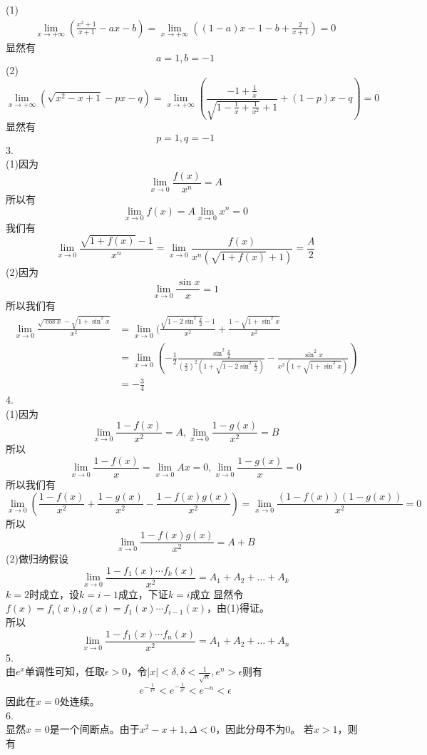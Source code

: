 \documentclass[utf8]{ctexart}
\begin{document}
(1)
\begin{align*}
	\lim\limits_{x\rightarrow+\infty}(\frac{x^2+1}{x+1}-ax-b)=\lim\limits_{x\rightarrow+\infty}((1-a)x-1-b+\frac{2}{x+1})=0
\end{align*}
显然有
\[a=1,b=-1\]
(2)
\[\lim\limits_{x\rightarrow+\infty}(\sqrt{x^2-x+1}-px-q)=\lim\limits_{x\rightarrow+\infty}(\frac{-1+\frac{1}{x}}{\sqrt{1-\frac{1}{x}+\frac{1}{x^2}}+1}+(1-p)x-q)=0\]
显然有
\[p=1,q=-1\]
3.\\
(1)因为
\[\lim\limits_{x\rightarrow0}\frac{f(x)}{x^n}=A\]
所以有
\[\lim\limits_{x\rightarrow0}f(x)=A\lim\limits_{x\rightarrow0}x^n=0\]
我们有
\[\lim\limits_{x\rightarrow0}\frac{\sqrt{1+f(x)}-1}{x^n}=\lim\limits_{x\rightarrow0}\frac{f(x)}{x^n(\sqrt{1+f(x)}+1)}=\frac{A}{2}\]
(2)因为
\[\lim\limits_{x\rightarrow0}\frac{\sin x}{x}=1\]
所以我们有
\begin{align*}
	\lim\limits_{x\rightarrow0}\frac{\sqrt{\cos x}-\sqrt{1+\sin^2x}}{x^2}&=\lim\limits_{x\rightarrow0}(\frac{\sqrt{1-2\sin^2\frac{x}{2}}-1}{x^2}+\frac{1-\sqrt{1+\sin^2x}}{x^2}\\
	&=\lim\limits_{x\rightarrow0}(-\frac{1}{2}\frac{\sin^2\frac{x}{2}}{(\frac{x}{2})^2(1+\sqrt{1-2\sin^2\frac{x}{2}})}-\frac{\sin^2x}{x^2(1+\sqrt{1+\sin^2x})})\\
	&=-\frac{3}{4}
\end{align*}
4.\\
(1)因为
\[\lim\limits_{x\rightarrow0}\frac{1-f(x)}{x^2}=A,\lim\limits_{x\rightarrow0}\frac{1-g(x)}{x^2}=B\]
所以
\[\lim\limits_{x\rightarrow0}\frac{1-f(x)}{x}=\lim\limits_{x\rightarrow0}Ax=0,\lim\limits_{x\rightarrow0}\frac{1-g(x)}{x}=0\]
所以我们有
\[\lim\limits_{x\rightarrow0}(\frac{1-f(x)}{x^2}+\frac{1-g(x)}{x^2}-\frac{1-f(x)g(x)}{x^2})=\lim\limits_{x\rightarrow0}\frac{(1-f(x))(1-g(x))}{x^2}=0\]
所以
\[\lim\limits_{x\rightarrow0}\frac{1-f(x)g(x)}{x^2}=A+B\]
(2)做归纳假设
\[\lim\limits_{x\rightarrow0}\frac{1-f_1(x)\cdots f_{k}(x)}{x^2}=A_1+A_2+\dots+A_{k}\]
$k=2$时成立，设$k=i-1$成立，下证$k=i$成立
显然令$f(x)=f_i(x),g(x)=f_1(x)\cdots f_{i-1}(x)$，由(1)得证。\\
所以
\[\lim\limits_{x\rightarrow0}\frac{1-f_1(x)\cdots f_{n}(x)}{x^2}=A_1+A_2+\dots+A_{n}\]
5.\\
由$e^x$单调性可知，任取$\epsilon>0$，令$|x|<\delta,\delta<\frac{1}{\sqrt{n}},e^n>\epsilon$则有
\[e^{-\frac{1}{x^2}}<e^{-\frac{1}{\delta^2}}<e^{-n}<\epsilon\]
因此在$x=0$处连续。\\
6.\\
显然$x=0$是一个间断点。由于$x^2-x+1,\Delta<0$，因此分母不为$0$。
若$x>1$，则有
\end{document}
